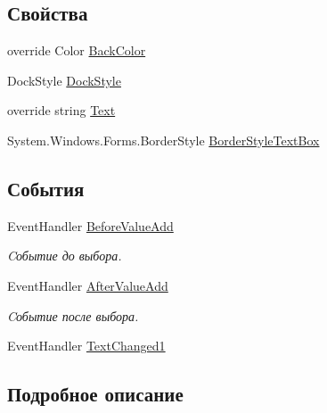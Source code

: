 \subsection*{Свойства}
\begin{DoxyCompactItemize}
\item 
override Color \mbox{\hyperlink{class_f_b_a_1_1_text_box_d_b_aa17c60fe353960dbef5473068478d8f4}{Back\+Color}}
\item 
Dock\+Style \mbox{\hyperlink{class_f_b_a_1_1_text_box_d_b_afcaf0fb1e87ee1044e859dfaae5449c4}{Dock\+Style}}
\item 
override string \mbox{\hyperlink{class_f_b_a_1_1_text_box_d_b_a67c76f27e32a16c6210cd155505da6f7}{Text}}
\item 
System.\+Windows.\+Forms.\+Border\+Style \mbox{\hyperlink{class_f_b_a_1_1_text_box_d_b_aba2d3af621d7e2fc627fcd00c730bede}{Border\+Style\+Text\+Box}}
\end{DoxyCompactItemize}
\subsection*{События}
\begin{DoxyCompactItemize}
\item 
Event\+Handler \mbox{\hyperlink{class_f_b_a_1_1_text_box_d_b_a55dd984787b1c540d3d7ef753cace83c}{Before\+Value\+Add}}
\begin{DoxyCompactList}\small\item\em Cобытие до выбора. \end{DoxyCompactList}\item 
Event\+Handler \mbox{\hyperlink{class_f_b_a_1_1_text_box_d_b_ac16ce5cee0ce1b18b9ba028682dd40da}{After\+Value\+Add}}
\begin{DoxyCompactList}\small\item\em Cобытие после выбора. \end{DoxyCompactList}\item 
Event\+Handler \mbox{\hyperlink{class_f_b_a_1_1_text_box_d_b_abf3f3c24cff90f9f29d4995fb4423943}{Text\+Changed1}}
\end{DoxyCompactItemize}


\subsection{Подробное описание}


